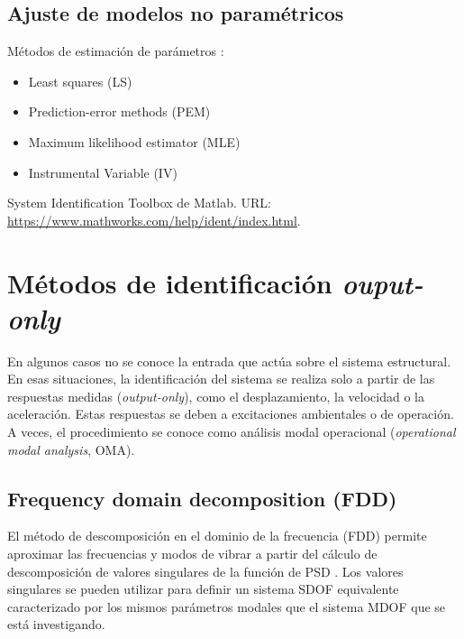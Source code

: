 \subsection{Ajuste de modelos no paramétricos}

Métodos de estimación de parámetros \parencite[Cap. 7]{Ljung1998}:

\begin{itemize}
    \item Least squares (LS)
    \item Prediction-error methods (PEM)
    \item Maximum likelihood estimator (MLE)
    \item Instrumental Variable (IV)
\end{itemize}

System Identification Toolbox de Matlab. URL: \url{https://www.mathworks.com/help/ident/index.html}.

\section{Métodos de identificación \emph{ouput-only} }

En algunos casos no se conoce la entrada que actúa sobre el sistema estructural. En esas situaciones, la identificación del sistema se realiza solo a partir de las respuestas medidas (\emph{output-only}), como el desplazamiento, la velocidad o la aceleración. Estas respuestas se deben a excitaciones ambientales o de operación. A veces, el procedimiento se conoce como análisis modal operacional (\emph{operational modal analysis}, OMA).

\subsection{Frequency domain decomposition (FDD)}

El método de descomposición en el dominio de la frecuencia (FDD) permite aproximar las frecuencias y modos de vibrar a partir del cálculo de descomposición de valores singulares de la función de PSD \parencite{brincker2001modalidentification}. Los valores singulares se pueden utilizar para definir un sistema SDOF equivalente caracterizado por los mismos parámetros modales que el sistema MDOF que se está investigando.


